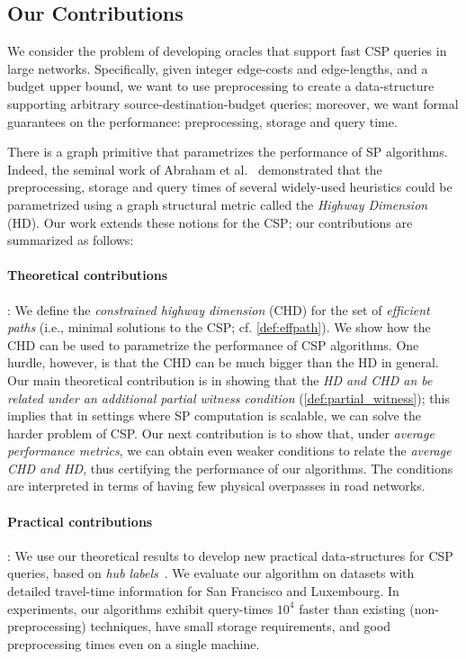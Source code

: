 \subsection{Our Contributions}
We consider the problem of developing oracles that support fast CSP queries in large networks. 
Specifically, given integer edge-costs and edge-lengths, and a budget upper bound, we want to use preprocessing to create a data-structure supporting arbitrary source-destination-budget queries; moreover, we want formal guarantees on the performance: preprocessing, storage and query time.

There is a graph primitive that parametrizes the performance of SP algorithms.
Indeed, the seminal work of Abraham et al.~\citep{highway2013, highway2010} demonstrated that the preprocessing, storage and query times of several widely-used heuristics could be parametrized using a graph structural metric called the \emph{Highway Dimension} (HD).
Our work extends these notions for the CSP; our contributions are summarized as follows:

\paragraph{Theoretical contributions}: 
We define the \emph{constrained highway dimension} (CHD) for the set of {\em efficient paths} (i.e., minimal solutions to the CSP; cf. \cref{def:effpath}). 
We show how the CHD can be used to parametrize the performance of CSP algorithms.
One hurdle, however, is that the CHD can be much bigger than the HD in general.
Our main theoretical contribution is in showing that the \emph{HD and CHD an be related under an additional partial witness condition} (\cref{def:partial_witness}); this implies that in settings where SP computation is scalable, we can solve the harder problem of CSP. 
Our next contribution is to show that, under \emph{average performance metrics}, we can obtain even weaker conditions to relate the \emph{average CHD and HD}, thus certifying the performance of our algorithms.
The conditions are interpreted in terms of having few physical overpasses in road networks.

\paragraph{Practical contributions}: 
We use our theoretical results to develop new practical data-structures for CSP queries, based on {\em hub labels}~\citep{cohen_definition_hl}. 
We evaluate our algorithm on datasets with detailed travel-time information for San Francisco and Luxembourg.
In experiments, our algorithms exhibit query-times $10^4$ faster than existing (non-preprocessing) techniques, have small storage requirements, and good preprocessing times even on a single machine. 
 

